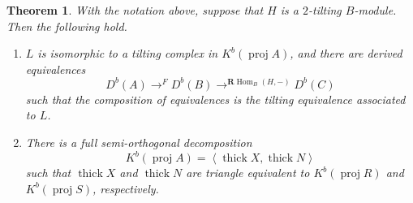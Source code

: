 \documentclass[reqno,12pt]{amsart}
\numberwithin{equation}{section}
\theoremstyle{plain}
\newtheorem{theorem}{\bf Theorem}[section]
\theoremstyle{definition}
\begin{document}
\begin{theorem}\label{derived-triangular-application}
With the notation above, suppose that $H$ is a $2$-tilting $B$-module.
Then the following hold.
\begin{enumerate}
\item[(1)] $L$ is isomorphic to a tilting complex in
$K^b(\operatorname{proj}A)$, and there are derived equivalences
\begin{equation}\label{lgdcdj}
D^b(A)\mathop{\longrightarrow}^{F}D^b(B)
\mathop{\longrightarrow}^{\mathbf{R}\operatorname{Hom}_B(H,-)}D^b(C)\end{equation}
such that the composition of equivalences is the tilting equivalence associated to $L$.
\item[(2)] There is a full semi-orthogonal decomposition
\begin{equation}\label{semiorthogonal-pair}
K^b(\operatorname{proj}A)
=\left\langle\operatorname{thick}X,\operatorname{thick}N\right\rangle
\end{equation}
such that $\operatorname{thick}X$ and $\operatorname{thick}N$ are triangle equivalent to
$K^b(\operatorname{proj}R)$ and $K^b(\operatorname{proj}S)$,
respectively.
\end{enumerate}
\end{theorem}
\end{document}
